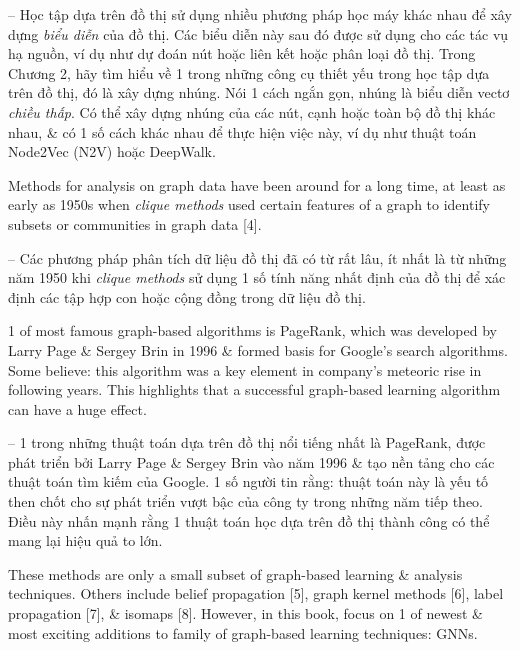 \documentclass{article}
\begin{document}
\begin{itemize}
\begin{itemize}
\begin{itemize}
            -- Học tập dựa trên đồ thị sử dụng nhiều phương pháp học máy khác nhau để xây dựng {\it biểu diễn} của đồ thị. Các biểu diễn này sau đó được sử dụng cho các tác vụ hạ nguồn, ví dụ như dự đoán nút hoặc liên kết hoặc phân loại đồ thị. Trong Chương 2, hãy tìm hiểu về 1 trong những công cụ thiết yếu trong học tập dựa trên đồ thị, đó là xây dựng nhúng. Nói 1 cách ngắn gọn, nhúng là biểu diễn vectơ {\it chiều thấp}. Có thể xây dựng nhúng của các nút, cạnh hoặc toàn bộ đồ thị khác nhau, \& có 1 số cách khác nhau để thực hiện việc này, ví dụ như thuật toán Node2Vec (N2V) hoặc DeepWalk.

            Methods for analysis on graph data have been around for a long time, at least as early as 1950s when {\it clique methods} used certain features of a graph to identify subsets or communities in graph data [4].

            -- Các phương pháp phân tích dữ liệu đồ thị đã có từ rất lâu, ít nhất là từ những năm 1950 khi {\it clique methods} sử dụng 1 số tính năng nhất định của đồ thị để xác định các tập hợp con hoặc cộng đồng trong dữ liệu đồ thị.

            1 of most famous graph-based algorithms is PageRank, which was developed by {\sc Larry Page \& Sergey Brin} in 1996 \& formed basis for Google's search algorithms. Some believe: this algorithm was a key element in company's meteoric rise in following years. This highlights that a successful graph-based learning algorithm can have a huge effect.

            -- 1 trong những thuật toán dựa trên đồ thị nổi tiếng nhất là PageRank, được phát triển bởi Larry Page \& Sergey Brin vào năm 1996 \& tạo nền tảng cho các thuật toán tìm kiếm của Google. 1 số người tin rằng: thuật toán này là yếu tố then chốt cho sự phát triển vượt bậc của công ty trong những năm tiếp theo. Điều này nhấn mạnh rằng 1 thuật toán học dựa trên đồ thị thành công có thể mang lại hiệu quả to lớn.

            These methods are only a small subset of graph-based learning \& analysis techniques. Others include belief propagation [5], graph kernel methods [6], label propagation [7], \& isomaps [8]. However, in this book, focus on 1 of newest \& most exciting additions to family of graph-based learning techniques: GNNs.


\end{itemize}
\end{itemize}
\end{itemize}
\end{document}
